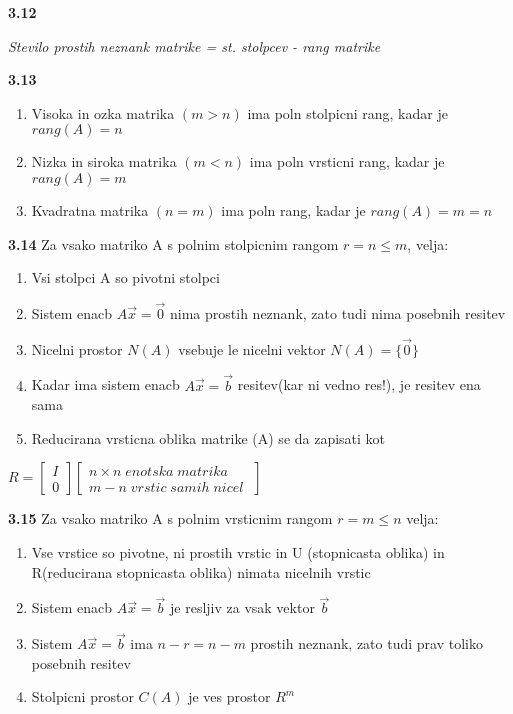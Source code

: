 \documentclass{article}
\begin{document}
\begin{multicols}{2}
\textbf{3.12}
\begin{center}
    \textit{Stevilo prostih neznank matrike = st. stolpcev - rang matrike}   
\end{center}

\textbf{3.13}
\begin{enumerate}
    \item Visoka in ozka matrika $(m > n)$ ima poln stolpicni rang, kadar je $rang(A) = n$
    \item Nizka in siroka matrika $(m < n)$ ima poln vrsticni rang, kadar je $rang(A) = m$
    \item Kvadratna matrika $(n = m)$ ima poln rang, kadar je $rang(A) = m = n$
\end{enumerate}

\textbf{3.14} Za vsako matriko A s polnim stolpicnim rangom $r = n \leq m$, velja:
\begin{enumerate}
    \item Vsi stolpci A so pivotni stolpci
    \item Sistem enacb $A\vec{x} = \vec{0}$ nima prostih neznank, zato tudi nima posebnih resitev
    \item Nicelni prostor $N(A)$ vsebuje le nicelni vektor $N(A) = \{\vec{0}\}$
    \item Kadar ima sistem enacb $A\vec{x} = \vec{b}$ resitev(kar ni vedno res!), je resitev ena sama
    \item Reducirana vrsticna oblika matrike (A) se da zapisati kot
\end{enumerate}
\begin{center}
    $R =
    \begin{bmatrix}
        I\\
        0
    \end{bmatrix}
    \begin{bmatrix}
        n \times n\; enotska\; matrika\\
        m - n\; vrstic\; samih\; nicel\;
    \end{bmatrix}
    $
\end{center}

\textbf{3.15} Za vsako matriko A s polnim vrsticnim rangom $r = m \leq n$ velja:
\begin{enumerate}
    \item Vse vrstice so pivotne, ni prostih vrstic in U (stopnicasta oblika) in R(reducirana stopnicasta oblika) nimata nicelnih vrstic
    \item Sistem enacb $A\vec{x} = \vec{b}$ je resljiv za vsak vektor $\vec{b}$
    \item Sistem $A\vec{x} = \vec{b}$ ima $n-r = n-m$ prostih neznank, zato tudi prav toliko posebnih resitev
    \item Stolpicni prostor $C(A)$ je ves prostor $R^{m}$
\end{enumerate}


\end{multicols}
\end{document}

